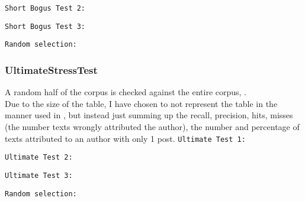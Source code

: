 \texttt{Short Bogus Test 2:}\nl
\nl

\texttt{Short Bogus Test 3:}\nl
\nl

\texttt{Random selection:}\nl


\subsubsection{UltimateStressTest}
A random half of the corpus is checked against the entire corpus, .\\
Due to the size of the table, I have chosen to not represent the table in the manner used in \cite{nr4}, but instead just summing up the recall, precision, hits, misses (the number texts wrongly attributed the author), the number and percentage of texts attributed to an author with only 1 post.
\clearpage
\texttt{Ultimate Test 1:}\nl


\clearpage
\texttt{Ultimate Test 2:}\nl



\clearpage
\texttt{Ultimate Test 3:}\nl


\clearpage
\texttt{Random selection:}\nl

